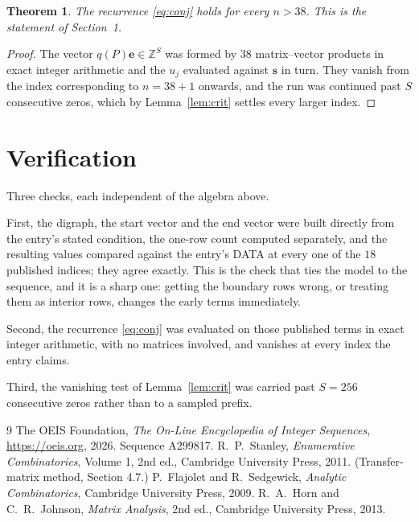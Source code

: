 \documentclass[11pt,a4paper]{article}
\theoremstyle{plain}
\newtheorem{theorem}{Theorem}
\theoremstyle{definition}
\begin{document}
\begin{theorem}
The recurrence \eqref{eq:conj} holds for every $n>38$. This is the statement of
Section~1.
\end{theorem}

\begin{proof}
The vector $q(P)\mathbf{e}\in\mathbb{Z}^{S}$ was formed by $38$ matrix--vector
products in exact integer arithmetic and the $u_j$ evaluated against $\mathbf{s}$ in turn.
They vanish from the index corresponding to $n=38+1$ onwards, and the run was continued
past $S$ consecutive zeros, which by Lemma~\ref{lem:crit} settles every larger index.
\end{proof}

\section{Verification}

Three checks, each independent of the algebra above.

First, the digraph, the start vector and the end vector were built directly from the
entry's stated condition, the one-row count computed separately, and the resulting values
compared against the entry's DATA at every one of the $18$ published indices; they
agree exactly. This is the check that ties the model to the sequence, and it is a sharp one:
getting the boundary rows wrong, or treating them as interior rows, changes the early terms
immediately.

Second, the recurrence \eqref{eq:conj} was evaluated on those published terms in exact
integer arithmetic, with no matrices involved, and vanishes at every index the entry claims.

Third, the vanishing test of Lemma~\ref{lem:crit} was carried past $S=256$ consecutive
zeros rather than to a sampled prefix.

\begin{thebibliography}{9}
 The OEIS Foundation, \emph{The On-Line Encyclopedia of Integer
Sequences}, \url{https://oeis.org}, 2026. Sequence A299817.
 R.~P.~Stanley, \emph{Enumerative Combinatorics}, Volume 1, 2nd ed.,
Cambridge University Press, 2011. (Transfer-matrix method, Section 4.7.)
 P.~Flajolet and R.~Sedgewick, \emph{Analytic Combinatorics}, Cambridge
University Press, 2009.
 R.~A.~Horn and C.~R.~Johnson, \emph{Matrix Analysis}, 2nd ed., Cambridge
University Press, 2013.
\end{thebibliography}
\end{document}
